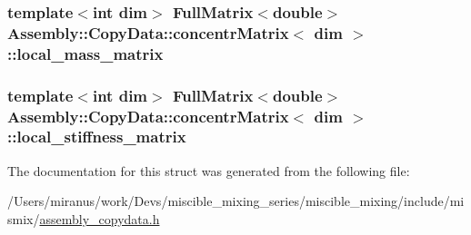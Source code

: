 \subsubsection[{local\+\_\+mass\+\_\+matrix}]{\setlength{\rightskip}{0pt plus 5cm}template$<$int dim$>$ Full\+Matrix$<$double$>$ {\bf Assembly\+::\+Copy\+Data\+::concentr\+Matrix}$<$ dim $>$\+::local\+\_\+mass\+\_\+matrix}\label{struct_assembly_1_1_copy_data_1_1concentr_matrix_ac9d3fa147044cb330edcbfb28c9a51d8}
\hypertarget{struct_assembly_1_1_copy_data_1_1concentr_matrix_ae611593ae75fc8317c368c54443a63f8}{}
\subsubsection[{local\+\_\+stiffness\+\_\+matrix}]{\setlength{\rightskip}{0pt plus 5cm}template$<$int dim$>$ Full\+Matrix$<$double$>$ {\bf Assembly\+::\+Copy\+Data\+::concentr\+Matrix}$<$ dim $>$\+::local\+\_\+stiffness\+\_\+matrix}\label{struct_assembly_1_1_copy_data_1_1concentr_matrix_ae611593ae75fc8317c368c54443a63f8}


The documentation for this struct was generated from the following file\+:\begin{DoxyCompactItemize}
\item 
/\+Users/miranus/work/\+Devs/miscible\+\_\+mixing\+\_\+series/miscible\+\_\+mixing/include/mismix/\hyperlink{assembly__copydata_8h}{assembly\+\_\+copydata.\+h}\end{DoxyCompactItemize}
